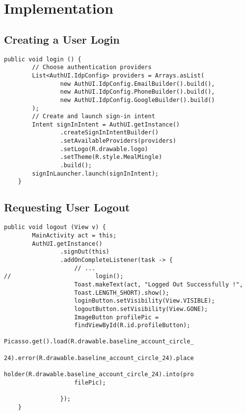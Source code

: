 \selectfont
\chapter{Implementation}

\section{Creating a User Login}
\begin{verbatim}
public void login () {
        // Choose authentication providers
        List<AuthUI.IdpConfig> providers = Arrays.asList(
                new AuthUI.IdpConfig.EmailBuilder().build(),
                new AuthUI.IdpConfig.PhoneBuilder().build(),
                new AuthUI.IdpConfig.GoogleBuilder().build()
        );
        // Create and launch sign-in intent
        Intent signInIntent = AuthUI.getInstance()
                .createSignInIntentBuilder()
                .setAvailableProviders(providers)
                .setLogo(R.drawable.logo)
                .setTheme(R.style.MealMingle)
                .build();
        signInLauncher.launch(signInIntent);
    }
\end{verbatim}
\section{Requesting User Logout}
\begin{verbatim}
public void logout (View v) {
        MainActivity act = this;
        AuthUI.getInstance()
                .signOut(this)
                .addOnCompleteListener(task -> {
                    // ...
//                        login();
                    Toast.makeText(act, "Logged Out Successfully !", 
                    Toast.LENGTH_SHORT).show();
                    loginButton.setVisibility(View.VISIBLE);
                    logoutButton.setVisibility(View.GONE);
                    ImageButton profilePic = 
                    findViewById(R.id.profileButton);
                    Picasso.get().load(R.drawable.baseline_account_circle_
                    24).error(R.drawable.baseline_account_circle_24).place
                    holder(R.drawable.baseline_account_circle_24).into(pro
                    filePic);

                });
    }
\end{verbatim}
